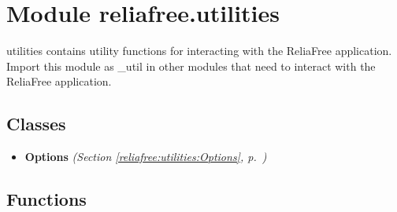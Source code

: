 %
%
%


\section{Module reliafree.utilities}

    \label{reliafree:utilities}
utilities contains utility functions for interacting with the ReliaFree 
application.  Import this module as \_util in other modules that need to 
interact with the ReliaFree application.



\subsection{Classes}

\begin{itemize}  \setlength{\parskip}{0ex}
  \item \textbf{Options}
  \textit{(Section \ref{reliafree:utilities:Options}, p.~\pageref{reliafree:utilities:Options})}

\end{itemize}


  \subsection{Functions}

    \label{reliafree:utilities:create_logger}

